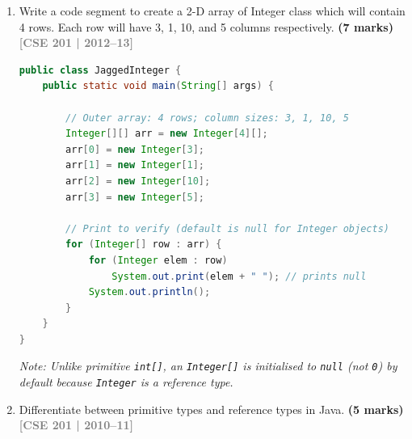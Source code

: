 \documentclass[12pt,a3paper]{article}
\newcommand{\yr}[1]{\hfill\textcolor{gray}{\small\textbf{[#1]}}}
\newcommand{\mk}[1]{\textcolor{orange!70!black}{\small\textbf{(#1 marks)}}}
\begin{document}
\begin{enumerate}
\begin{tcolorbox}[enhanced,breakable,ansbox,
  colback=cB!4,colframe=cB,boxrule=0.8pt,arc=5pt,
  title={\textbf{Answer --- \texttt{countOccurrences} Method}},
  fonttitle=\bfseries\color{white},colbacktitle=cB]
\end{tcolorbox}

\item Write a code segment to create a 2-D array of Integer class which will contain 4 rows. Each row will have 3, 1, 10, and 5 columns respectively. \mk{7}
\yr{CSE 201 | 2012--13}

\begin{tcolorbox}[enhanced,breakable,ansbox,
  colback=cB!4,colframe=cB,boxrule=0.8pt,arc=5pt,
  title={\textbf{Answer --- 2-D \texttt{Integer} Array with Jagged Rows}},
  fonttitle=\bfseries\color{white},colbacktitle=cB]

\begin{lstlisting}[language=Java]
public class JaggedInteger {
    public static void main(String[] args) {

        // Outer array: 4 rows; column sizes: 3, 1, 10, 5
        Integer[][] arr = new Integer[4][];
        arr[0] = new Integer[3];
        arr[1] = new Integer[1];
        arr[2] = new Integer[10];
        arr[3] = new Integer[5];

        // Print to verify (default is null for Integer objects)
        for (Integer[] row : arr) {
            for (Integer elem : row)
                System.out.print(elem + " "); // prints null
            System.out.println();
        }
    }
}
\end{lstlisting}

\textit{Note: Unlike primitive \texttt{int[]}, an \texttt{Integer[]}
is initialised to \texttt{null} (not \texttt{0}) by default because
\texttt{Integer} is a reference type.}

\end{tcolorbox}

\item Differentiate between primitive types and reference types in Java. \mk{5}
\yr{CSE 201 | 2010--11}

\begin{tcolorbox}[enhanced,breakable,ansbox,
  colback=cB!4,colframe=cB,boxrule=0.8pt,arc=5pt,
  title={\textbf{Answer --- Primitive Types vs.\ Reference Types}},
  fonttitle=\bfseries\color{white},colbacktitle=cB]


\end{tcolorbox}
\end{enumerate}
\end{document}
